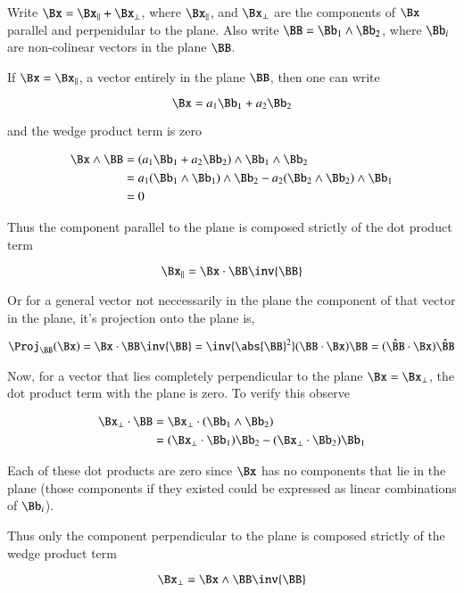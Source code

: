 Write $\Bx = \Bx_\parallel + \Bx_\perp$, where $\Bx_\parallel$, and $\Bx_\perp$ are the components of $\Bx$ parallel and perpenidular to the plane.  Also write
$\BB = \Bb_1 \wedge \Bb_2$, where $\Bb_i$ are non-colinear vectors in the plane $\BB$.

If $\Bx = \Bx_\parallel$, a vector entirely in the plane $\BB$, then one can
write

\[
\Bx = a_1\Bb_1 + a_2\Bb_2
\]

and the wedge product term is zero

\begin{align*}
\Bx \wedge \BB 
&= \left( a_1\Bb_1 + a_2\Bb_2 \right) \wedge \Bb_1 \wedge \Bb_2 \\
&= a_1 ( \Bb_1 \wedge \Bb_1 ) \wedge \Bb_2
 - a_2 ( \Bb_2 \wedge \Bb_2 ) \wedge \Bb_1 \\
&= 0
\end{align*}

Thus the component parallel to the plane is composed strictly of the dot
product term

\begin{equation}
\Bx_\parallel = \Bx \cdot \BB \inv{\BB}
\end{equation}

Or for a general vector not neccessarily in the plane the component
of that vector in the plane, it's projection onto the plane is,

\[
\Proj_{\BB}(\Bx) = \Bx \cdot \BB \inv{\BB}
= \inv{\abs{\BB}^2}(\BB \cdot \Bx)\BB
= (\hat{\BB} \cdot \Bx)\hat{\BB}
\]

Now, for a vector that lies completely perpendicular to the plane $\Bx = \Bx_\perp$, the dot product term with the plane is zero.  To verify this observe

\begin{align*}
\Bx_\perp \cdot \BB 
&= \Bx_\perp \cdot (\Bb_1 \wedge \Bb_2) \\
&= (\Bx_\perp \cdot \Bb_1) \Bb_2 - (\Bx_\perp \cdot \Bb_2) \Bb_1 \\
\end{align*}

Each of these dot products are zero since $\Bx$ has no components that lie
in the plane (those components if they existed could be expressed as linear
combinations of $\Bb_i$).

Thus only the component perpendicular to the plane is composed strictly of the 
wedge product term

\begin{equation}
\Bx_\perp = \Bx \wedge \BB \inv{\BB}
\end{equation}

